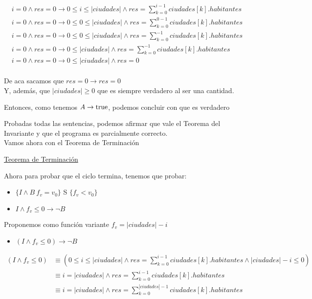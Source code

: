 \documentclass[10pt,a4paper]{article}
\begin{document}
\begin {enumerate}
    \begin{align*}
        i = 0 \land res = 0 \to 0 \leq i \leq |ciudades| \land res = \sum\limits_{k=0}^{i - 1}{ciudades[k].habitantes} \\
        i = 0 \land res = 0 \to 0 \leq 0 \leq |ciudades| \land res = \sum\limits_{k=0}^{0 - 1}{ciudades[k].habitantes} \\
        i = 0 \land res = 0 \to 0 \leq 0 \leq |ciudades| \land res = \sum\limits_{k=0}^{-1}{ciudades[k].habitantes} \\
        i = 0 \land res = 0 \to  0 \leq |ciudades| \land res = \sum\limits_{k=0}^{-1}{ciudades[k].habitantes} \\
        i = 0 \land res = 0 \to  0 \leq |ciudades| \land res = 0 \\
    \end{align*}

    De aca sacamos que $res = 0 \to res = 0$ \\
    Y, además, que $|ciudades| \geq 0$ que es siempre verdadero al ser una cantidad.

    Entonces, como tenemos $A \to \mathrm{true}$, podemos concluir con que es verdadero

    Probadas todas las sentencias, podemos afirmar que vale el Teorema del Invariante y que el programa es parcialmente correcto.\\
    Vamos ahora con el Teorema de Terminación

    \underline{Teorema de Terminación}




    Ahora para probar que el ciclo termina, tenemos que probar:

    \begin{itemize}
        \item $\{ I \land B \ f_{v} = v_{0}  \}$ S $\{f_{v} < v_{0}\}$  
        \item $ I \land f_{v} \leq 0 \to \neg B$
    \end{itemize}

    Proponemos como función variante $f_{v} = |ciudades| - i$

    \begin{itemize}
        \item 
            $(I \land f_{v} \leq 0) \to \neg B$
    \end{itemize}

    \begin{align*}
        (I \land f_{v} \leq 0) &\equiv (0 \leq i \leq |ciudades| \land res = \sum\limits_{k=0}^{i -1}{ciudades[k].habitantes} \land |ciudades| - i \leq 0) \\
        &\equiv i = |ciudades| \land res = \sum\limits_{k=0}^{i -1}{ciudades[k].habitantes} \\
        &\equiv i = |ciudades| \land res = \sum\limits_{k=0}^{|ciudades| -1}{ciudades[k].habitantes}
    \end{align*}



\end{enumerate}
\end{document}
